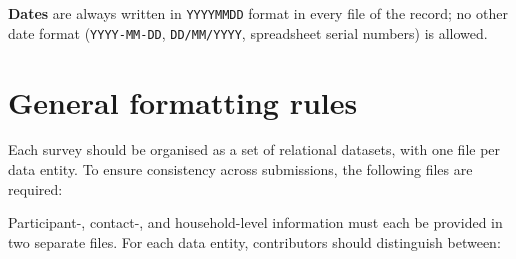 \documentclass[11pt,a4paper]{article}
\begin{document}
\noindent \textbf{Dates} are always written in \texttt{YYYYMMDD} format in every file of the record; no other date format (\texttt{YYYY-MM-DD}, \texttt{DD/MM/YYYY}, spreadsheet serial numbers) is allowed.

\section{General formatting rules}
\noindent Each survey should be organised as a set of relational datasets, with one file per data entity. To ensure consistency across submissions, the following files are required:

\begin{table}[h]
\centering
\label{tab:datafiles}
\end{table}

\noindent Participant-, contact-, and household-level information must each be provided in two separate files. For each data entity, contributors should distinguish between:
\end{document}
